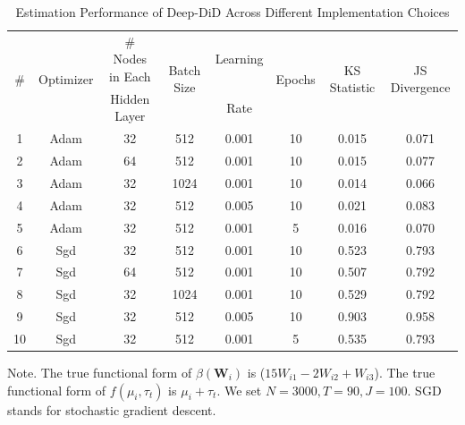 \begin{table}[h!tbp]
\caption{Estimation Performance of Deep-DiD Across Different Implementation Choices}\label{tab:sim_hyperparam}
\scriptsize
{\def\arraystretch{1.2}  
\begin{tabular}{cccccccc}
\hline\hline
\multirow{2}{*}{\centering \#} & \multirow{2}{*}{\centering Optimizer} & \# Nodes in Each & \multirow{2}{*}{\centering Batch Size} & Learning & \multirow{2}{*}{\centering Epochs} &  \multirow{2}{*}{\centering KS Statistic} & \multirow{2}{*}{\centering JS Divergence}          \\
&   & Hidden Layer     &                             & Rate     &                               &                               &  \\
\hline
1  & Adam      & 32         & 512        & 0.001         & 10     & 0.015        & 0.071         \\
2  & Adam      & 64         & 512        & 0.001         & 10     & 0.015        & 0.077         \\
3  & Adam      & 32         & 1024        & 0.001         & 10     & 0.014        & 0.066         \\
4  & Adam      & 32         & 512        & 0.005         & 10     & 0.021        & 0.083         \\
5  & Adam      & 32         & 512        & 0.001         & 5     & 0.016        & 0.070         \\
6  & Sgd      & 32         & 512        & 0.001         & 10     & 0.523        & 0.793         \\
7  & Sgd      & 64         & 512        & 0.001         & 10     & 0.507        & 0.792         \\
8  & Sgd      & 32         & 1024        & 0.001         & 10     & 0.529        & 0.792         \\
9  & Sgd      & 32         & 512        & 0.005         & 10     & 0.903        & 0.958         \\
10  & Sgd      & 32         & 512        & 0.001         & 5     & 0.535        & 0.793         \\
\hline\hline
\end{tabular}
}
\parbox{\linewidth}{
\vspace{1eX} 
\scriptsize Note. The true functional form of $\beta(\mathbf{W}_{i})$ is ($15W_{i1} - 2W_{i2} + W_{i3}$). The true functional form of $f(\mu_i, \tau_t)$ is $\mu_i + \tau_t$. We set $N=3000, T=90, J=100$. SGD stands for stochastic gradient descent.}
\end{table}